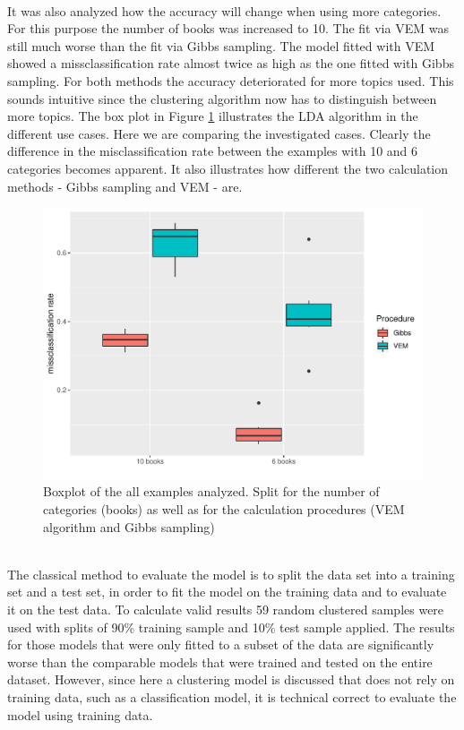\documentclass[11pt,a4paper]{article}
\begin{document}
\ \\
It was also analyzed how the accuracy will change when using more categories. For this purpose the number of books was increased to 10. The fit via VEM was still much worse than the fit via Gibbs sampling. The model fitted with VEM showed a missclassification rate almost twice as high as the one fitted with Gibbs sampling. For both methods the accuracy deteriorated for more topics used. This sounds intuitive since the clustering algorithm now has to distinguish between more topics. The box plot in Figure \ref{fig:comparison_boxplot} illustrates the LDA algorithm in the different use cases. Here we are comparing the investigated cases. Clearly the difference in the misclassification rate between the examples with 10 and 6 categories becomes apparent. It also illustrates how different the two calculation methods - Gibbs sampling and VEM - are.

\begin{figure}[h]
	\centering\includegraphics[width=1\textwidth]{comparison_boxplot.pdf}
	\caption{Boxplot of the all examples analyzed. Split for the number of categories (books) as well as for the calculation procedures (VEM algorithm and Gibbs sampling)}
	\label{fig:comparison_boxplot}
\end{figure}
\ \\
The classical method to evaluate the model is to split the data set into a training set and a test set, in order to fit the model on the training data and to evaluate it on the test data. To calculate valid results 59 random clustered samples were used with splits of 90\% training sample and 10\% test sample applied. The results for those models that were only fitted to a subset of the data are significantly worse than the comparable models that were trained and tested on the entire dataset. However, since here a clustering model is discussed that does not rely on training data, such as a classification model, it is technical correct to evaluate the model using training data.
\end{document}
